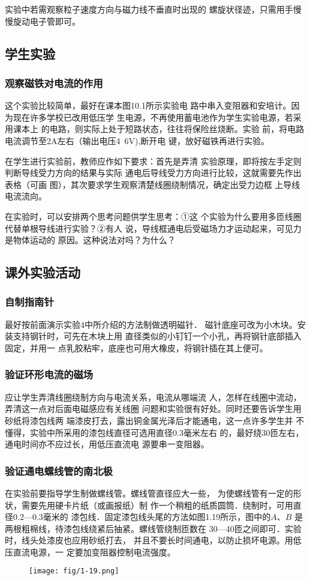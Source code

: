 实验中若需观察粒子速度方向与磁力线不垂直时出现的
螺旋状径迹，只需用手慢慢旋动电子管即可。

\subsection{学生实验}
\subsubsection{观察磁铁对电流的作用}
这个实验比较简单，最好在课本图10.1所示实验电
路中串入变阻器和安培计。因为现在许多学校已改用低压学
生电源，不再使用蓄电池作为学生实验电源，若采用课本上
的电路，则实际上处于短路状态，往往将保险丝烧断。实验
前，将电路电流调节至2A左右（输出电压4~6V),断开电
键，放好磁铁再进行实验。

在学生进行实验前，教师应作如下要求：首先是弄清
实验原理，即将按左手定则判断导线受力方向的结果与实际
通电后导线受力方向进行比较，这就需要先作出表格（可画
图），其次要求学生观察清楚线圈绕制情况，确定出受力边框
上导线电流流向。

在实验时，可以安排两个思考问题供学生思考：①这
个实验为什么要用多匝线圈代替单根导线进行实验？②有人
说，导线框通电后受磁场力才运动起来，可见力是物体运动的
原因。这种说法对吗？为什么？

\subsection{课外实验活动}
\subsubsection{自制指南针}
最好按前面演示实验4中所介绍的方法制做透明磁针．
磁针底座可改为小木块。安装支持钢针时，可先在木块上用
直径类似的小钉钉一个小孔，再将钢针底部插入固定，并用一
点乳胶粘牢，底座也可用大橡皮，将钢针插在其上便可。

\subsubsection{验证环形电流的磁场}
应让学生弄清线圈绕制方向与电流关系，电流从哪端流
人，怎样在线圈中流动，弄清这一点对后面电磁感应有关线圈
问题和实验很有好处。同时还要告诉学生用砂纸将漆包线两
端漆皮打去，露出铜金属光泽后才能通电，这一点许多学生并
不懂得，实验中所采用的漆包线直径可选用直径0.3毫米左右
的，最好绕30匝左右，通电时间亦不应过长，用低压直流电
源要串一变阻器。

\subsubsection{验证通电螺线管的南北极}
在实验前要指导学生制做螺线管。螺线管直径应大一些，
为使螺线管有一定的形状，需要先用硬卡片纸（或画报纸）制
作一个稍粗的纸质圆筒．绕制时，可用直径0.2—0.3毫米的
漆包线．固定漆包线头尾的方法如图1.19所示，图中的$A$、$B$
是两根粗棉线，待漆包线绕紧后抽紧。螺线管绕制匝数在
30—40匝之间即可．实验时，线头处漆皮也应用砂纸打去，
并且不要长时间通电，以防止损坏电源。用低压直流电源，一
定要加变阻器控制电流强度。
\begin{figure}[htp]
    \centering
\texttt{[image: fig/1-19.png]}
    \caption{}
\end{figure}

